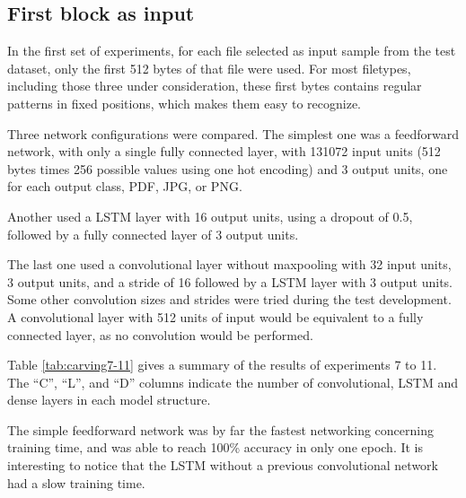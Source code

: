 

\subsection{First block as input}
In the first set of experiments, for each file selected as input sample from the test dataset, only the first 512 bytes of that file were used. For most filetypes, including those three under consideration, these first bytes contains regular patterns in fixed positions, which makes them easy to recognize.



Three network configurations were compared. The simplest one was a feedforward network, with only a single fully connected layer, with 131072 input units (512 bytes times 256 possible values using one hot encoding) and 3 output units, one for each output class, PDF, JPG, or PNG.

Another used a LSTM layer with 16 output units, using a dropout of 0.5, followed by a fully connected layer of 3 output units.

The last one used a convolutional layer without maxpooling with 32 input units, 3 output units, and a stride of 16 followed by a LSTM layer with 3 output units. Some other convolution sizes and strides were tried during the test development. A convolutional layer with 512 units of input would be equivalent to a fully connected layer, as no convolution would be performed.

Table \ref{tab:carving7-11} gives a summary of the results of experiments 7 to 11. The ``C'', ``L'', and ``D'' columns indicate the number of convolutional, LSTM and dense layers in each model structure.


The simple feedforward network was by far the fastest networking concerning training time, and was able to reach 100\% accuracy in only one epoch. It is interesting to notice that the LSTM without a previous convolutional network had a slow training time.





